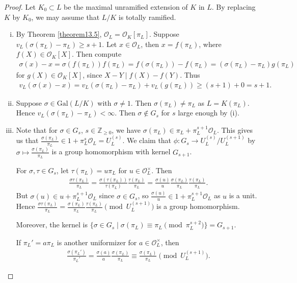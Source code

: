 \documentclass{article}
\theoremstyle{definition}
\begin{document}
\begin{proof}
    Let $K_0 \subset L$ be the maximal unramified extension of $K$ in $L$. By replacing $K$ by $K_0$, we may assume that $L/K$ is totally ramified.
    \begin{enumerate}[(i)]
        \item By Theorem \ref{theorem13.5}, $\mathcal{O}_L = \mathcal{O}_K[\pi_L]$. Suppose $v_L(\sigma(\pi_L)-\pi_L)\ge s+1$. Let $x \in \mathcal{O}_L$, then $x = f(\pi_L)$, where $f(X) \in \mathcal{O}_K[X]$. Then compute 
        \begin{align*}
            \sigma(x)-x = \sigma(f(\pi_L))f(\pi_L) = f(\sigma(\pi_L)) - f(\pi_L) = (\sigma(\pi_L)-\pi_L)g(\pi_L)
        \end{align*}
        for $g(X) \in \mathcal{O}_K[X]$, since $X - Y \mid f(X) - f(Y)$. Thus 
        \begin{align*}
            v_L(\sigma(x)-x) = v_L(\sigma(\pi_L)-\pi_L) + v_L(g(\pi_L)) \ge (s+1) + 0 = s+1.
        \end{align*}
        \item Suppose $\sigma \in \text{Gal}(L/K)$ with $\sigma \neq 1$. Then $\sigma(\pi_L) \neq \pi_L$ as $L = K(\pi_L)$. Hence $v_L(\sigma(\pi_L)-\pi_L)<\infty$. Then $\sigma \not\in G_s$ for $s$ large enough by (i). 
        \item Note that for $\sigma \in G_s$, $s \in \mathbb{Z}_{\ge 0}$, we have $\sigma(\pi_L) \in \pi_L + \pi_L^{s+1}\mathcal{O}_L$. This gives us that $\frac{\sigma(\pi_L)}{\pi_L} \in 1 + \pi_L^s \mathcal{O}_L = U_L^{(s)}$. We claim that $\phi : G_s \to U_L^{(s)}/U_L^{(s+1)}$ by $\sigma \mapsto \frac{\sigma(\pi_L)}{\pi_L}$ is a group homomorphism with kernel $G_{s+1}$.
        \vspace{1mm}
         
        For $\sigma, \tau \in G_s$, let $\tau(\pi_L) = u \pi_L$ for $u \in \mathcal{O}_L^\times$. Then \begin{align*}
            \frac{\sigma \tau(\pi_L)}{\pi_L} = \frac{\sigma(\tau(\pi_L))}{\tau(\pi_L)} \frac{\tau(\pi_L)}{\pi_L} = \frac{\sigma(u)}{u} \frac{\sigma(\pi_L)}{\pi_L}\frac{\tau(\pi_L)}{\pi_L}.
        \end{align*}
        But $\sigma(u) \in u + \pi_L^{s+1}\mathcal{O}_L$ since $\sigma \in G_s$, so $\frac{\sigma(u)}{u} \in 1 + \pi_L^{s+1}\mathcal{O}_L$ as $u$ is a unit. Hence $\frac{\sigma \tau (\pi_L)}{\pi_L} = \frac{\sigma(\pi_L)}{\pi_L} \frac{\tau(\pi_L)}{\pi_L} \pmod{U_L^{(s+1)}}$ is a group homomorphism.
        \vspace{1mm}
         
        Moreover, the kernel is $\{\sigma \in G_s \mid \sigma(\pi_L) \equiv \pi_L \pmod{\pi_L^{s+2}}\} = G_{s+1}$.
        \vspace{1mm}
         
        If $\pi_L' = a \pi_L$ is another uniformizer for $a \in \mathcal{O}_L^\times$, then \begin{align*}
            \frac{\sigma(\pi_L')}{\pi_L'} = \frac{\sigma(a)}{a}\frac{\sigma(\pi_L)}{\pi_L} \equiv \frac{\sigma(\pi_L)}{\pi_L} \pmod{U_L^{(s+1)}}.
        \end{align*}
    \end{enumerate}
\end{proof}
\end{document}
